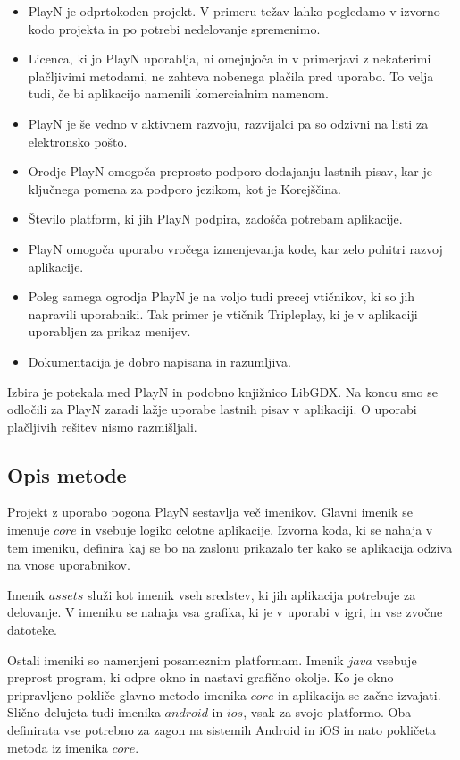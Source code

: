 \begin{itemize}
\item PlayN je odprtokoden projekt. V primeru težav lahko pogledamo v izvorno kodo projekta in po potrebi nedelovanje spremenimo.
\item Licenca, ki jo PlayN uporablja, ni omejujoča in v primerjavi z nekaterimi plačljivimi metodami, ne zahteva nobenega plačila pred uporabo. To velja tudi, če bi aplikacijo namenili komercialnim namenom.
\item PlayN je še vedno v aktivnem razvoju, razvijalci pa so odzivni na listi za elektronsko pošto.
\item Orodje PlayN omogoča preprosto podporo dodajanju lastnih pisav, kar je ključnega pomena za podporo jezikom, kot je Korejščina.
\item Število platform, ki jih PlayN podpira, zadošča potrebam aplikacije.
\item PlayN omogoča uporabo vročega izmenjevanja kode, kar zelo pohitri razvoj aplikacije.
\item Poleg samega ogrodja PlayN je na voljo tudi precej vtičnikov, ki so jih napravili uporabniki. Tak primer je vtičnik Tripleplay, ki je v aplikaciji uporabljen za prikaz menijev.
\item Dokumentacija je dobro napisana in razumljiva.
\end{itemize}

Izbira je potekala med PlayN in podobno knjižnico LibGDX. Na koncu smo se odločili za PlayN zaradi lažje uporabe lastnih pisav v aplikaciji. O uporabi plačljivih rešitev nismo razmišljali.

\subsection{Opis metode}

Projekt z uporabo pogona PlayN sestavlja več imenikov. Glavni imenik se imenuje $core$ in vsebuje logiko celotne aplikacije. Izvorna koda, ki se nahaja v tem imeniku, definira kaj se bo na zaslonu prikazalo ter kako se aplikacija odziva na vnose uporabnikov. 

Imenik $assets$ služi kot imenik vseh sredstev, ki jih aplikacija potrebuje za delovanje. V imeniku se nahaja vsa grafika, ki je v uporabi v igri, in vse zvočne datoteke.

Ostali imeniki so namenjeni posameznim platformam. Imenik $java$ vsebuje preprost program, ki odpre okno in nastavi grafično okolje. Ko je okno pripravljeno pokliče glavno metodo imenika $core$ in aplikacija se začne izvajati. Slično delujeta tudi imenika $android$ in $ios$, vsak za svojo platformo. Oba definirata vse potrebno za zagon na sistemih Android in iOS in nato pokličeta metoda iz imenika $core$.



